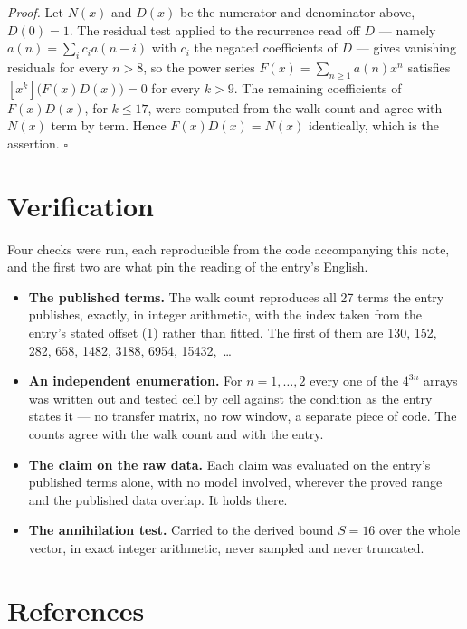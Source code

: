 \documentclass[11pt]{article}
\theoremstyle{definition}
\begin{document}
{\itshape Proof.} Let $N(x)$ and $D(x)$ be the numerator and denominator above, $D(0)=1$. The residual test applied to the recurrence read off $D$ --- namely $a(n) = \sum_i c_i a(n-i)$ with $c_i$ the negated coefficients of $D$ --- gives vanishing residuals for every $n > 8$, so the power series $F(x)=\sum_{n\ge 1}a(n)x^n$ satisfies $[x^k]\bigl(F(x)D(x)\bigr) = 0$ for every $k > 9$. The remaining coefficients of $F(x)D(x)$, for $k \le 17$, were computed from the walk count and agree with $N(x)$ term by term. Hence $F(x)D(x) = N(x)$ identically, which is the assertion. $\square$

\section{Verification}

Four checks were run, each reproducible from the code accompanying this note, and the first two are what pin the reading of the entry's English.

\begin{itemize}

\item {\bfseries The published terms.} The walk count reproduces all 27 terms the entry publishes, exactly, in integer arithmetic, with the index taken from the entry's stated offset (1) rather than fitted. The first of them are 130, 152, 282, 658, 1482, 3188, 6954, 15432,~\dots

\item {\bfseries An independent enumeration.} For $n = 1,\dots,2$ every one of the $4^{3n}$ arrays was written out and tested cell by cell against the condition as the entry states it --- no transfer matrix, no row window, a separate piece of code. The counts agree with the walk count and with the entry.

\item {\bfseries The claim on the raw data.} Each claim was evaluated on the entry's published terms alone, with no model involved, wherever the proved range and the published data overlap. It holds there.

\item {\bfseries The annihilation test.} Carried to the derived bound $S = 16$ over the whole vector, in exact integer arithmetic, never sampled and never truncated.

\end{itemize}

\section{References}
\end{document}
